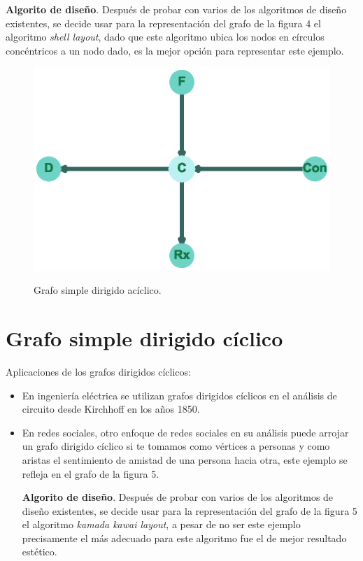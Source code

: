 \documentclass{article}
\begin{document}
\textbf{Algorito de diseño}.
Después de probar con varios de los algoritmos de diseño existentes, se decide usar para la representación del grafo de la figura 4 el algoritmo \textit{shell layout}, dado que este algoritmo ubica los nodos en círculos concéntricos a un nodo dado, es la mejor opción para representar este ejemplo.



\begin{center}

\end{center}

\begin{figure}[h]
\begin{center}
\includegraphics[scale=0.7]{Graf4_shell_layout.eps}\\
\caption{Grafo simple dirigido acíclico.}
\end{center}
\end{figure}
\newpage

\section{Grafo simple dirigido cíclico}
Aplicaciones de los grafos dirigidos cíclicos:
\begin{itemize}
\item En ingeniería eléctrica se utilizan grafos dirigidos cíclicos en el análisis de circuito desde Kirchhoff en los años 1850.
\item En redes sociales, otro enfoque de redes sociales en su análisis puede arrojar un grafo dirigido cíclico si te tomamos como vértices a personas y como aristas el sentimiento de amistad de una persona hacia otra, este ejemplo se refleja en el grafo de la figura 5.

\textbf{Algorito de diseño}.
Después de probar con varios de los algoritmos de diseño existentes, se decide usar para la representación del grafo de la figura 5 el algoritmo \textit{kamada kawai layout}, a pesar de no ser este ejemplo precisamente el más adecuado para este algoritmo fue el de mejor resultado estético.


\end{itemize}
\begin{center}

\end{center}
\end{document}
